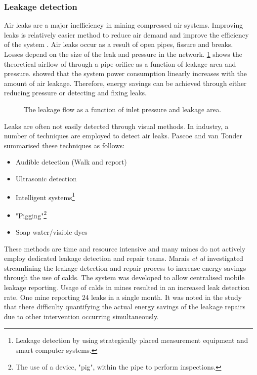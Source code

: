 		 \subsubsection{Leakage detection}	 
		 Air leaks are a major inefficiency in mining compressed air systems. Improving leaks is relatively easier method to  reduce air demand and improve the efficiency of the system \cite{van2011sustaining}. Air leaks occur as a result of open pipes, fissure and breaks. Losses depend on the size of the leak and pressure in the network. \cref{fig: Leak losses} shows the theoretical airflow of through a pipe orifice as a function of leakage area and pressure\footnotemark[1]. \cite{van2011sustaining} showed that the system power consumption linearly increases with the amount of air leakage. Therefore, energy savings can be achieved through either reducing pressure or detecting and fixing leaks.
		 \begin{figure}[h]
		 	\centering
		 	\fbox{\hspace{2cm}\hspace{2cm}}
		 	\caption[The leakage flow as a function of inlet pressure and leakage area]{ The leakage flow as a function of inlet pressure and leakage area\protect\footnotemark[3].}
		 	\label{fig: Leak losses}
		 \end{figure}
	 \par 
		 Leaks are often not easily detected through visual methods. In industry, a number of techniques are employed to detect air leaks. Pascoe \cite{Pascoe2016Masters} and van Tonder \cite{vanTonder2010Masters} summarised these techniques as follows:
		 \begin{itemize}
		 	\item Audible detection (Walk and report)
		 	\item Ultrasonic detection
		 	\item Intelligent systems\footnote{Leakage detection by using strategically placed measurement equipment and smart computer systems.}
		 	\item "Pigging"\footnote{The use of a device, "pig", within the pipe to perform inspections.}
		 	\item Soap water/visible dyes 
		 \end{itemize}
	 	 These methods are time and resource intensive and many mines do not actively employ dedicated leakage detection and repair teams. Marais \textit{et al} \cite{marais2009increased} investigated streamlining the leakage detection and repair process to increase energy savings through the use of \gls{calds}. The system was developed to allow centralised mobile leakage reporting. Usage of \gls{calds} in mines resulted in an increased leak detection rate. One mine reporting 24 leaks in a single month. It was noted in the study that there difficulty quantifying the actual energy savings of the leakage repairs due to other intervention occurring simultaneously.	
		 
